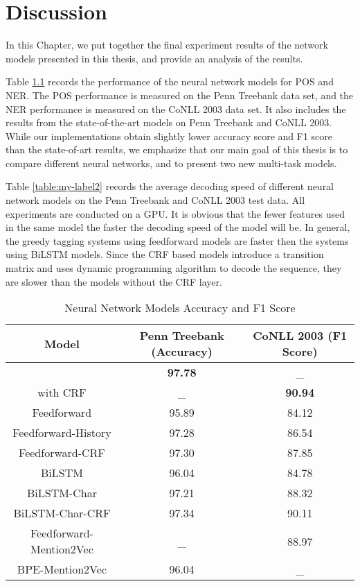 \chapter{Discussion}

In this Chapter, we put together the final experiment results of the network models presented in this thesis, and provide an analysis of the results.

Table \ref{table:my-label1} records the performance of the neural network models for POS and NER. The POS performance is measured on the Penn Treebank data set, and the NER performance is measured on the CoNLL 2003 data set. It also includes the results from the state-of-the-art models on Penn Treebank and CoNLL 2003. While our implementations obtain slightly lower accuracy score and F1 score than the state-of-art results, we emphasize that our main goal of this thesis is to compare different neural networks, and to present two new multi-task models.

Table \ref{table:my-label2} records the average decoding speed of different neural network models on the Penn Treebank and CoNLL 2003 test data. All experiments are conducted on a GPU. It is obvious that the fewer features used in the same model the faster the decoding speed of the model will be. In general, the greedy tagging systems using feedforward models are faster then the systems using BiLSTM models. Since the CRF based models introduce a transition matrix and uses dynamic programming algorithm to decode the sequence, they are slower than the models without the CRF layer.

\begin{table}[]
\centering
\caption{Neural Network Models Accuracy and F1 Score}
\label{table:my-label1}
\begin{tabular}{|c|c|c|}
\hline
Model         & Penn Treebank (Accuracy)  & CoNLL 2003 (F1 Score)       \\ \hline
\text{\cite{ling2015finding}} & \textbf{97.78} & _ \\ \hline
\text{\cite{lample2016neural}} with CRF & _ & \textbf{90.94} \\ \hline 
Feedforward    & 95.89          &   84.12     \\ \hline
Feedforward-History & 97.28     & 86.54        \\ \hline
Feedforward-CRF     & 97.30          &   87.85     \\ \hline
BiLSTM  & 96.04     & 84.78                             \\ \hline
BiLSTM-Char & 97.21 & 88.32             \\ \hline
BiLSTM-Char-CRF & 97.34  & 90.11             \\ \hline
Feedforward-Mention2Vec  & _    & 88.97                       \\ \hline
BPE-Mention2Vec & 96.04     &  _   \\ \hline   
\end{tabular}
\end{table}

